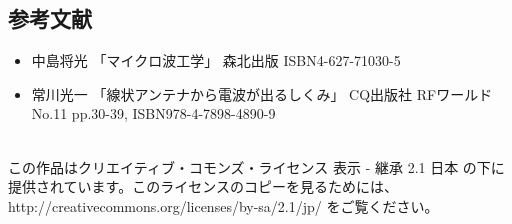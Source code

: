\subsection*{参考文献}
\begin{itemize}
  \item 中島将光
    「マイクロ波工学」 森北出版 ISBN4-627-71030-5
  \item 常川光一
    「線状アンテナから電波が出るしくみ」 CQ出版社 RFワールド No.11 pp.30-39, ISBN978-4-7898-4890-9
\end{itemize}

\clearpage
\mbox{}
\vspace{58em}\\
この作品はクリエイティブ・コモンズ・ライセンス 表示 - 継承 2.1 日本 の下に提供されています。このライセンスのコピーを見るためには、http://creativecommons.org/licenses/by-sa/2.1/jp/ をご覧ください。